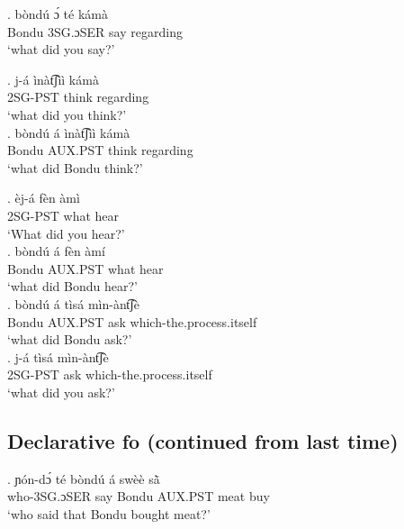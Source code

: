 \documentclass{assets/fieldnotes}
\begin{document}
\exg. bòndú ɔ́ té kámà\\
Bondu 3SG.ɔSER say regarding\\
`what did you say?' \\


\exg. j-á ìnàt͡ʃìì kámà\\
2SG-PST think regarding\\
`what did you think?' \\

\exg. bòndú á ìnàt͡ʃìì kámà\\
Bondu AUX.PST think regarding\\
`what did Bondu think?' \\


\exg. èj-á fèn àmì\\
2SG-PST what hear\\
`What did you hear?' \\

\exg. bòndú á fèn àmí\\
Bondu AUX.PST what hear\\
`what did Bondu hear?' \\


\exg. bòndú á tìsá mìn-ànt͡ʃè\\
Bondu AUX.PST ask which-the.process.itself\\
`what did Bondu ask?' \\

\exg. j-á tìsá mìn-ànt͡ʃè\\
2SG-PST ask which-the.process.itself\\
`what did you ask?' \\




\subsection{Declarative fo (continued from last time)}
\exg. ɲón-dɔ́ té bòndú á swèè sã̀\\
who-3SG.ɔSER say Bondu AUX.PST meat buy\\
`who said that Bondu bought meat?' \\
\end{document}
